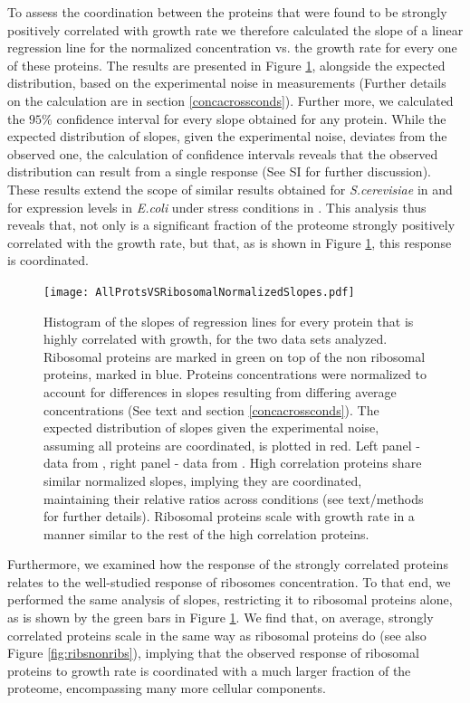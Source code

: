 \documentclass[notitlepage]{article}
\begin{document}
To assess the coordination between the proteins that were found to be strongly positively correlated with growth rate we therefore calculated the slope of a linear regression line for the normalized concentration vs. the growth rate for every one of these proteins.
The results are presented in Figure \ref{fig:globalfit}, alongside the expected distribution, based on the experimental noise in measurements (Further details on the calculation are in section \ref{concacrossconds}).
Further more, we calculated the $95\%$ confidence interval for every slope obtained for any protein.
While the expected distribution of slopes, given the experimental noise, deviates from the observed one, the calculation of confidence intervals reveals that the observed distribution can result from a single response (See SI for further discussion).
These results extend the scope of similar results obtained for \emph{S.cerevisiae} in \cite{Keren2013a} and for expression levels in \emph{E.coli} under stress conditions in \cite{Kaneko2014}.
This analysis thus reveals that, not only is a significant fraction of the proteome strongly positively correlated with the growth rate, but that, as is shown in Figure \ref{fig:globalfit}, this response is coordinated.

\begin{figure}[h]
\centering
\texttt{[image: AllProtsVSRibosomalNormalizedSlopes.pdf]}
\caption{
    Histogram of the slopes of regression lines for every protein that is highly correlated with growth, for the two data sets analyzed.
    Ribosomal proteins are marked in green on top of the non ribosomal proteins, marked in blue.
    Proteins concentrations were normalized to account for differences in slopes resulting from differing average concentrations (See text and section \ref{concacrossconds}).
    The expected distribution of slopes given the experimental noise, assuming all proteins are coordinated, is plotted in red.
    Left panel - data from \cite{Valgepea2013}, right panel - data from \cite{Heinemann2014}.
    High correlation proteins share similar normalized slopes, implying they are coordinated, maintaining their relative ratios across conditions (see text/methods for further details).
    Ribosomal proteins scale with growth rate in a manner similar to the rest of the high correlation proteins.
}
\label{fig:globalfit}
\end{figure}

Furthermore, we examined how the response of the strongly correlated proteins relates to the well-studied response of ribosomes concentration.
To that end, we performed the same analysis of slopes, restricting it to ribosomal proteins alone, as is shown by the green bars in Figure \ref{fig:globalfit}.
We find that, on average, strongly correlated proteins scale in the same way as ribosomal proteins do (see also Figure \ref{fig:ribsnonribs}), implying that the observed response of ribosomal proteins to growth rate is coordinated with a much larger fraction of the proteome, encompassing many more cellular components.
\end{document}
